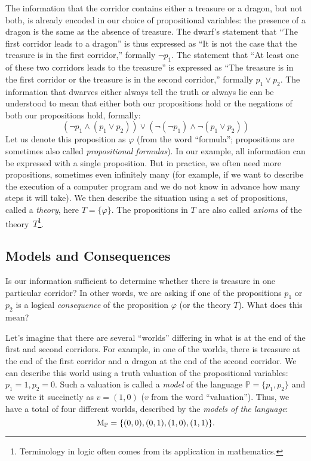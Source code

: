 The information that the corridor contains either a treasure or a dragon, but not both, is already encoded in our choice of propositional variables: the presence of a dragon is the same as the absence of treasure. The dwarf's statement that ``The first corridor leads to a dragon'' is thus expressed as ``It is not the case that the treasure is in the first corridor,'' formally \(\neg p_1\). The statement that ``At least one of these two corridors leads to the treasure'' is expressed as ``The treasure is in the first corridor or the treasure is in the second corridor,'' formally \( p_1 \lor p_2\). The information that dwarves either always tell the truth or always lie can be understood to mean that either both our propositions hold or the negations of both our propositions hold, formally:
\[
    (\neg p_1 \land (p_1 \lor p_2)) \lor (\neg (\neg p_1) \land \neg (p_1 \lor p_2))
\]
Let us denote this proposition as \( \varphi \) (from the word ``formula''; propositions are sometimes also called \emph{propositional formulas}). In our example, all information can be expressed with a single proposition. But in practice, we often need more propositions, sometimes even infinitely many (for example, if we want to describe the execution of a computer program and we do not know in advance how many steps it will take). We then describe the situation using a set of propositions, called a \emph{theory}, here \( T = \{ \varphi \} \). The propositions in \( T \) are also called \emph{axioms} of the theory~\( T \)\footnote{Terminology in logic often comes from its application in mathematics.}.


\subsection{Models and Consequences}

Is our information sufficient to determine whether there is treasure in one particular corridor? In other words, we are asking if one of the propositions \( p_1 \) or \( p_2 \) is a logical \emph{consequence} of the proposition \( \varphi \) (or the theory \( T \)). What does this mean?

Let's imagine that there are several ``worlds'' differing in what is at the end of the first and second corridors. For example, in one of the worlds, there is treasure at the end of the first corridor and a dragon at the end of the second corridor. We can describe this world using a truth valuation of the propositional variables: \( p_1 = 1, p_2 = 0 \). Such a valuation is called a \emph{model} of the language \( \mathbb{P} = \{p_1, p_2\} \) and we write it succinctly as \( v = (1,0) \) (\(v\) from the word ``valuation''). Thus, we have a total of four different worlds, described by the \emph{models of the language}:
\[
    \operatorname{M}_\mathbb{P} = \{(0,0), (0,1), (1,0), (1,1)\}.
\]

